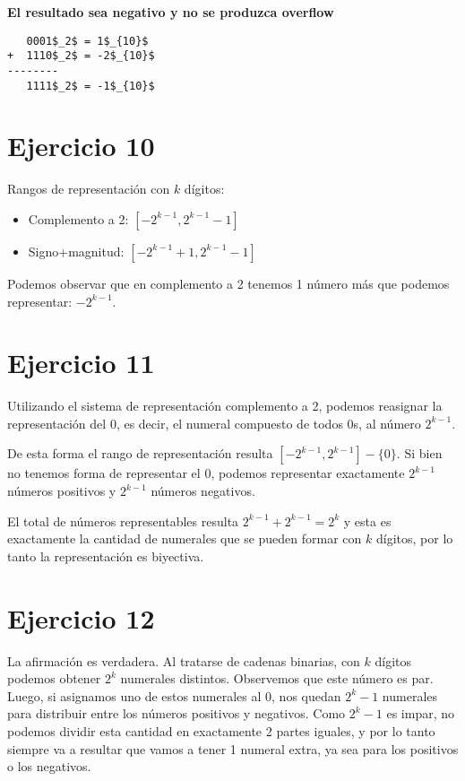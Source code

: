 \textbf{El resultado sea negativo y no se produzca overflow}
\begin{lstlisting}
   0001$_2$ = 1$_{10}$
+  1110$_2$ = -2$_{10}$
--------
   1111$_2$ = -1$_{10}$
\end{lstlisting}

\section{Ejercicio 10}

Rangos de representación con $k$ dígitos:

\begin{itemize}
  \item Complemento a 2: $[-2^{k-1}, 2^{k-1} - 1]$
  \item Signo+magnitud: $[-2^{k-1} + 1, 2^{k-1} - 1]$
\end{itemize}

Podemos observar que en complemento a 2 tenemos 1 número más que podemos representar: $-2^{k-1}$.

\section{Ejercicio 11}

Utilizando el sistema de representación complemento a 2, podemos reasignar la representación del $0$, es decir, el numeral compuesto de todos 0s, al número $2^{k-1}$.

De esta forma el rango de representación resulta $[-2^{k-1}, 2^{k-1}] - \{0\}$. Si bien no tenemos forma de representar el $0$, podemos representar exactamente $2^{k-1}$ números positivos y $2^{k-1}$ números negativos.

El total de números representables resulta $2^{k-1} + 2^{k-1} = 2^k$ y esta es exactamente la cantidad de numerales que se pueden formar con $k$ dígitos, por lo tanto la representación es biyectiva.

\section{Ejercicio 12}

La afirmación es verdadera. Al tratarse de cadenas binarias, con $k$ dígitos podemos obtener $2^k$ numerales distintos. Observemos que este número es par. Luego, si asignamos uno de estos numerales al $0$, nos quedan $2^k - 1$ numerales para distribuir entre los números positivos y negativos. Como $2^k - 1$ es impar, no podemos dividir esta cantidad en exactamente 2 partes iguales, y por lo tanto siempre va a resultar que vamos a tener 1 numeral extra, ya sea para los positivos o los negativos.

